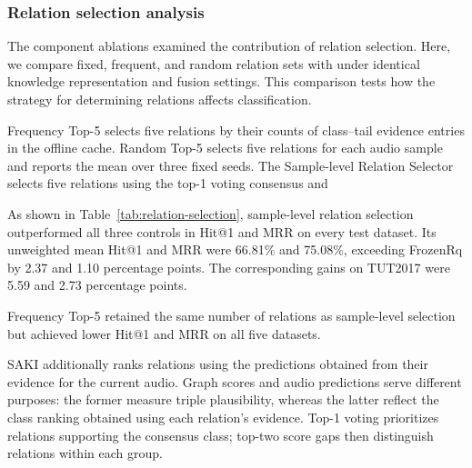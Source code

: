 \subsubsection{Relation selection analysis}\label{sec:relation-analysis}




The component ablations examined the contribution of relation selection. Here, we compare fixed, frequent, and random relation sets with  under identical knowledge representation and fusion settings. This comparison tests how the strategy for determining relations affects classification.

 Frequency Top-5 selects five relations by their counts of class--tail evidence entries in the offline cache. Random Top-5 selects five relations for each audio sample and reports the mean over three fixed seeds. The Sample-level Relation Selector selects five relations using the top-1 voting consensus and 

As shown in Table~\ref{tab:relation-selection}, sample-level relation selection outperformed all three controls in Hit@1 and MRR on every test dataset. Its unweighted mean Hit@1 and MRR were 66.81\% and 75.08\%, exceeding FrozenRq by 2.37 and 1.10 percentage points. The corresponding gains on TUT2017 were 5.59 and 2.73 percentage points.

Frequency Top-5 retained the same number of relations as sample-level selection but achieved lower Hit@1 and MRR on all five datasets.  

 SAKI additionally ranks relations using the predictions obtained from their evidence for the current audio. Graph scores and audio predictions serve different purposes: the former measure triple plausibility, whereas the latter reflect the class ranking obtained using each relation's evidence. Top-1 voting prioritizes relations supporting the consensus class; top-two score gaps then distinguish relations within each group. 

